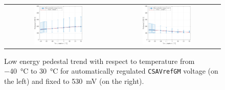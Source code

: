 \begin{figure}[h!]
    \centering
    \begin{tabular}{cc}
        \includegraphics[width=0.475\textwidth]{Images/chap1/results/gain_pedestal/low_energy_pedestal_auto_0011.pdf} & \includegraphics[width=0.475\textwidth]{Images/chap1/results/gain_pedestal/low_energy_pedestal_530mV.pdf}\\
    \end{tabular}
    \caption{Low energy pedestal trend with respect to temperature from \SI{-40}{\celsius} to \SI{30}{\celsius} for automatically regulated \texttt{CSAVrefGM} voltage (on the left) and fixed to \SI{530}{\milli\volt} (on the right).}
    \label{figFDTpedestalLowEnergies}
\end{figure}


